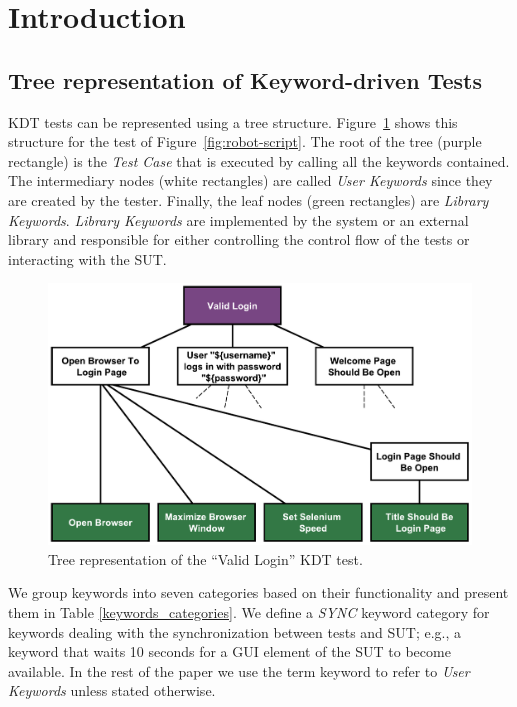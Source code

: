 \section{Introduction}
\label{sec:evolution-introduction}

\subsection{Tree representation of Keyword-driven Tests}
\label{sec:tree-representation-KDT}

KDT tests can be represented using a tree structure. Figure~\ref{fig:robotframework_tree} shows this structure for the test of Figure~\ref{fig:robot-script}. The root of the tree (purple rectangle) is the \emph{Test Case} that is executed by calling all the keywords contained. The intermediary nodes (white rectangles) are called \emph{User Keywords} since they are created by the tester. Finally, the leaf nodes (green rectangles) are \emph{Library Keywords}. \emph{Library Keywords} are implemented by the system or an external library and responsible for either controlling the control flow of the tests or interacting with the SUT.

\begin{figure}
\centering
\includegraphics[width=0.7\columnwidth]{figures/evolution/robotframework_tree.pdf}
\caption{Tree representation of the ``Valid Login'' KDT test.}
\label{fig:robotframework_tree}
\end{figure}

We group keywords into seven categories based on their functionality and present them in Table \ref{keywords_categories}. We define a \emph{SYNC} keyword category for keywords dealing with the synchronization between tests and SUT; e.g., a keyword that waits 10 seconds for a GUI element of the SUT to become available. In the rest of the paper we use the term keyword to refer to \emph{User Keywords} unless stated otherwise.

